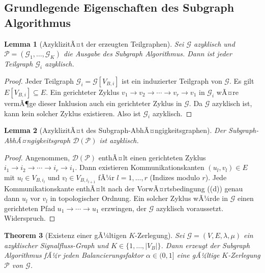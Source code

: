 ﻿\documentclass[12pt,a4paper]{article}
\newtheorem{theorem}{Theorem}[section]
\newtheorem{lemma}[theorem]{Lemma}
\theoremstyle{definition}
\begin{document}
\subsection{Grundlegende Eigenschaften des Subgraph Algorithmus}
\label{subsec:subgraph-props}

\begin{lemma}[AzyklizitÃ¤t der erzeugten Teilgraphen]
\label{lem:acyclic}
Sei $\mathcal{G}$ azyklisch und $\mathcal{P} = (\mathcal{G}_1, \ldots,
\mathcal{G}_K)$ die Ausgabe des Subgraph Algorithmus. Dann ist jeder
Teilgraph $\mathcal{G}_i$ azyklisch.
\end{lemma}

\begin{proof}
Jeder Teilgraph $\mathcal{G}_i = \mathcal{G}[V_{B,i}]$ ist ein induzierter
Teilgraph von $\mathcal{G}$. Es gilt $E[V_{B,i}] \subseteq E$. Ein
gerichteter Zyklus $v_1 \to v_2 \to \cdots \to v_r \to v_1$ in
$\mathcal{G}_i$ wÃ¤re vermÃ¶ge dieser Inklusion auch ein gerichteter Zyklus
in $\mathcal{G}$. Da $\mathcal{G}$ azyklisch ist, kann kein solcher Zyklus
existieren. Also ist $\mathcal{G}_i$ azyklisch.
\end{proof}

\begin{lemma}[AzyklizitÃ¤t des Subgraph-AbhÃ¤ngigkeitsgraphen]
\label{lem:subdep-acyclic}
Der Subgraph-AbhÃ¤ngig\-keitsgraph $\mathcal{D}(\mathcal{P})$ ist azyklisch.
\end{lemma}

\begin{proof}
Angenommen, $\mathcal{D}(\mathcal{P})$ enthÃ¤lt einen gerichteten Zyklus
$i_1 \to i_2 \to \cdots \to i_r \to i_1$. Dann existieren
Kommunikationskanten $(u_l, v_l) \in E$ mit $u_l \in V_{B,i_l}$ und
$v_l \in V_{B,i_{l+1}}$ fÃ¼r $l = 1, \ldots, r$ (Indizes modulo $r$).
Jede Kommunikationskante enthÃ¤lt nach der VorwÃ¤rtsbedingung
((d)) genau dann $u_l$ vor $v_l$ in topologischer
Ordnung. Ein solcher Zyklus wÃ¼rde in $\mathcal{G}$ einen gerichteten
Pfad $u_1 \to \cdots \to u_1$ erzwingen, der $\mathcal{G}$ azyklisch
voraussetzt. Widerspruch.
\end{proof}

\begin{theorem}[Existenz einer gÃ¼ltigen $K$-Zerlegung]
\label{thm:existence}
Sei $\mathcal{G} = (V, E, \lambda, \mu)$ ein azyklischer Signalfluss-Graph
und $K \in \{1, \ldots, |V_B|\}$. Dann erzeugt der Subgraph Algorithmus
fÃ¼r jeden Balancierungsfaktor $\alpha \in (0,1]$ eine gÃ¼ltige $K$-Zerlegung
$\mathcal{P}$ von $\mathcal{G}$.
\end{theorem}
\end{document}
